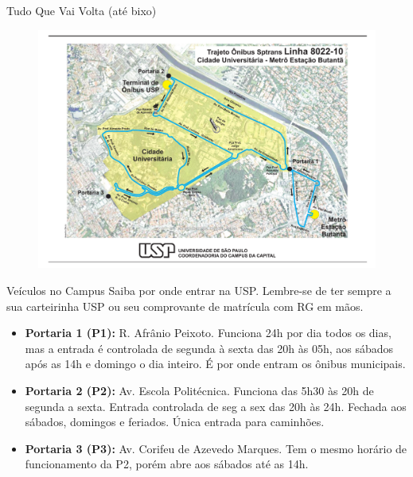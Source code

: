 \begin{secao}{Tudo Que Vai Volta (até bixo)}
\begin{figure}[H]
  \begin{center}
    \includegraphics[height=\textwidth, angle=90]{img/8022-10.pdf}
  \end{center}
\end{figure}


\begin{subsecao}{Veículos no Campus}
Saiba por onde entrar na USP. Lembre-se de ter sempre a sua carteirinha USP ou
seu comprovante de matrícula com RG em mãos.
\begin{itemize}
  \item {\bf Portaria 1 (P1):} R. Afrânio Peixoto. Funciona 24h por dia todos os
    dias, mas a entrada é controlada de segunda à sexta das 20h às 05h, aos sábados
    após as 14h e domingo o dia inteiro. É por onde entram os ônibus municipais.

  \item {\bf Portaria 2 (P2):} Av. Escola Politécnica. Funciona das 5h30 às 20h
    de segunda a sexta. Entrada controlada de seg a sex das 20h às 24h. Fechada
    aos sábados, domingos e feriados. Única entrada para caminhões.

  \item {\bf Portaria 3 (P3):} Av. Corifeu de Azevedo Marques. Tem o mesmo horário
    de funcionamento da P2, porém abre aos sábados até as 14h.


\end{itemize}
\end{subsecao}
\end{secao}

